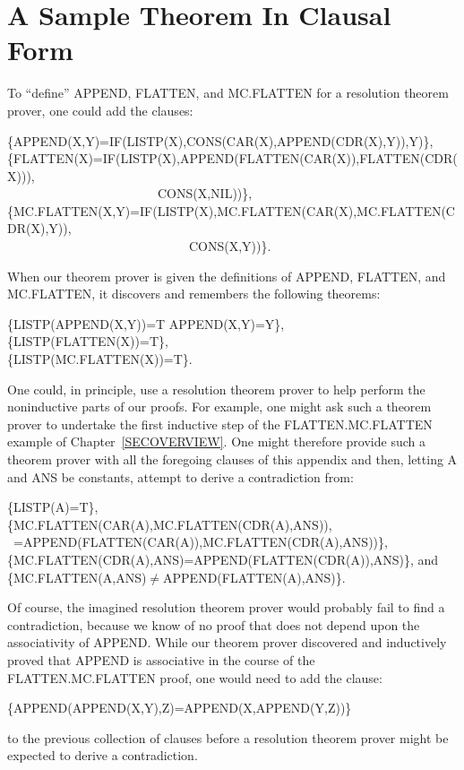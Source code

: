 \documentclass[10pt]{book}
\newenvironment{pubasis}{\begin{flushleft}}{\end{flushleft}}
\begin{document}
\section{A Sample Theorem In Clausal Form}
To ``define'' APPEND, FLATTEN, and MC.FLATTEN for a resolution theorem
prover, one could add
the clauses:
\begin{pubasis}
\{APPEND(X,Y)=IF(LISTP(X),CONS(CAR(X),APPEND(CDR(X),Y)),Y)\},\\

\{FLATTEN(X)=IF(LISTP(X),APPEND(FLATTEN(CAR(X)),FLATTEN(CDR(X))),\\
~~~~~~~~~~~~~~~~~~~~~~~~CONS(X,NIL))\},\\

\{MC.FLATTEN(X,Y)=IF(LISTP(X),MC.FLATTEN(CAR(X),MC.FLATTEN(CDR(X),Y)),\\
~~~~~~~~~~~~~~~~~~~~~~~~~~~~~CONS(X,Y))\}.\\
\end{pubasis}
When our theorem prover is given the definitions of APPEND, FLATTEN,
and MC.FLATTEN, it discovers and remembers the following theorems:
\begin{pubasis}
\{LISTP(APPEND(X,Y))=T APPEND(X,Y)=Y\},\\

\{LISTP(FLATTEN(X))=T\},\\

\{LISTP(MC.FLATTEN(X))=T\}.\\
\end{pubasis}
One could, in principle, use a resolution theorem prover to help perform
the noninductive parts of our proofs.  For example, one might
ask such a theorem prover to undertake the first
inductive step of the FLATTEN.MC.FLATTEN
example of Chapter~\ref{SECOVERVIEW}.  One might therefore provide such a theorem
prover with all the foregoing clauses of this appendix and then, letting A and ANS
be constants, attempt to derive a contradiction from:
\begin{pubasis}
\{LISTP(A)=T\},\\

\{MC.FLATTEN(CAR(A),MC.FLATTEN(CDR(A),ANS)),\\
~=APPEND(FLATTEN(CAR(A)),MC.FLATTEN(CDR(A),ANS))\},\\

\{MC.FLATTEN(CDR(A),ANS)=APPEND(FLATTEN(CDR(A)),ANS)\}, and\\

\{MC.FLATTEN(A,ANS)$\neq$APPEND(FLATTEN(A),ANS)\}.\\
\end{pubasis}
Of course, the imagined resolution theorem prover would probably fail to find
a contradiction, because we know of no proof that does not depend
upon the associativity of APPEND.  While our theorem prover discovered
and inductively proved that APPEND is associative in the course of
the FLATTEN.MC.FLATTEN proof, one would need to add the clause:
\begin{pubasis}
\{APPEND(APPEND(X,Y),Z)=APPEND(X,APPEND(Y,Z))\}\\
\end{pubasis}
to the previous collection of clauses before a resolution theorem
prover might be expected to derive a contradiction.
\end{document}

